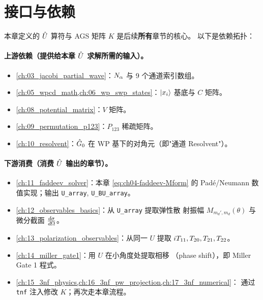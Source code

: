 \section{接口与依赖}
\label{sec:ch04-interface}

本章定义的 \(\hat{U}\) 算符与 AGS 矩阵 \(K\) 是后续\textbf{所有}章节的核心。
以下是依赖拓扑：

\paragraph{上游依赖（提供给本章 \(\hat{U}\) 求解所需的输入）。}
\begin{itemize}
  \item \cref{ch:03_jacobi_partial_wave}：\(N_\alpha\) 与 9 个通道索引数组。
  \item \cref{ch:05_wpcd_math,ch:06_wp_swp_states}：\(\ket{x_{i}}\) 基底与
        \(C\) 矩阵。
  \item \cref{ch:08_potential_matrix}：\(V\) 矩阵。
  \item \cref{ch:09_permutation_p123}：\(P_{123}\) 稀疏矩阵。
  \item \cref{ch:10_resolvent}：\(\hat{G}_0\) 在 WP 基下的对角元（即"通道
        Resolvent"）。
\end{itemize}

\paragraph{下游消费（消费 \(\hat{U}\) 输出的章节）。}
\begin{itemize}
  \item \cref{ch:11_faddeev_solver}：本章 \cref{eq:ch04-faddeev-Mform}
        的 Padé/Neumann 数值实现；输出 \texttt{U\_array}, \texttt{U\_BU\_array}。
  \item \cref{ch:12_observables_basics}：从 \texttt{U\_array} 提取弹性散
        射振幅 \(M_{m_d', m_d}(\theta)\) 与微分截面 \(\frac{d\sigma}{d\Omega}\)。
  \item \cref{ch:13_polarization_observables}：从同一 \(U\) 提取
        \({i T_{11}}, {T_{20}}, {T_{21}}, {T_{22}}\)。
  \item \cref{ch:14_miller_gate1}：用 \(U\) 在小角度处提取相移
        （phase shift），即 Miller Gate 1 程式。
  \item \cref{ch:15_3nf_physics,ch:16_3nf_pw_projection,ch:17_3nf_numerical}：
        通过 \texttt{tnf} 注入修改 \(K\)；再次走本章流程。
\end{itemize}

